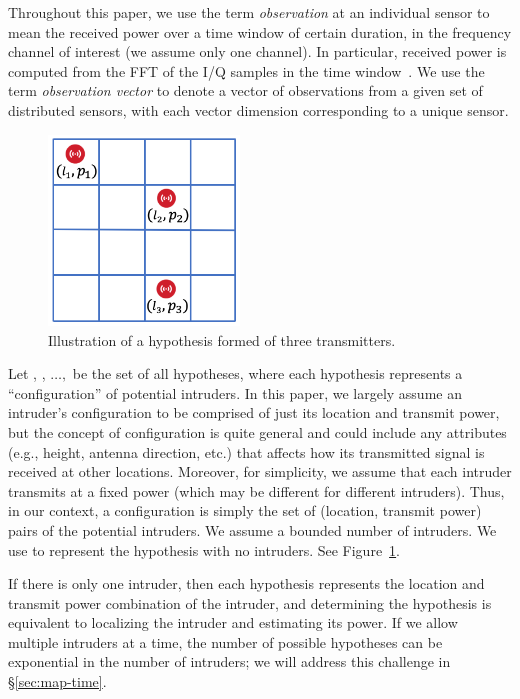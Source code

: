  Throughout this
paper, we use the term {\em observation} at an individual sensor to
mean the received power over a time window of certain duration, in the
frequency channel of interest (we assume only one channel). In
particular, received power is computed from the FFT of the I/Q samples
in the time window~\cite{infocom18-spectrum}. We use the term {\em observation
  vector} \vx to denote a vector of observations from a given set of
distributed sensors, with each vector dimension corresponding to a
unique sensor.

\begin{figure}
\includegraphics[width=2in]{chapters/ipsn/figures/hypothesis.png}
\caption{Illustration of a hypothesis formed of three transmitters.}
\label{fig:hypothesis-grid}
\end{figure}
 Let \hz, \ho, $\ldots,$ \hM be the set of all
hypotheses, where each hypothesis \hj represents a ``configuration''
of potential intruders. In this paper, we largely assume an
  intruder's configuration to be comprised of just its location and
  transmit power, but the concept of configuration is quite general
  and could include any attributes (e.g., height, antenna direction,
  etc.) that affects how its transmitted signal is received at other
  locations. Moreover, for simplicity, we assume that each intruder
  transmits at a fixed power (which may be different for different
  intruders). Thus, in our context, a configuration is simply the set
of (location, transmit power) pairs of the potential intruders. We
assume a bounded number of intruders. We use \hz to represent the
hypothesis with no intruders. See Figure~\ref{fig:hypothesis-grid}.

If there is only one intruder, then each hypothesis represents the
location and transmit power combination of the intruder, and
determining the hypothesis is equivalent to localizing the intruder
and estimating its power. If we allow multiple intruders at a time,
the number of possible hypotheses can be exponential in the number of
intruders; we will address this challenge in
\S\ref{sec:map-time}.

